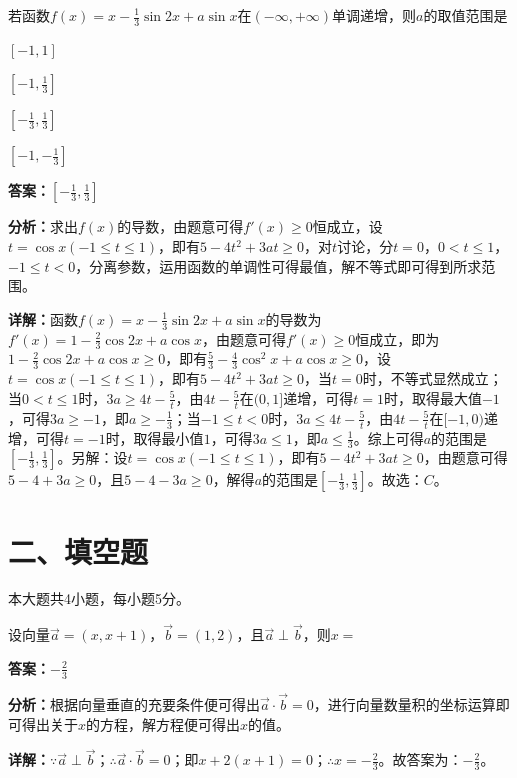 \begin{question}[points=5]
若函数$f(x)=x-\frac{1}{3}\sin2x+a\sin x$在$(-\infty,+\infty)$单调递增，则$a$的取值范围是
\begin{choices}
  \item $[-1,1]$
  \item $[-1,\frac{1}{3}]$
  \item $[-\frac{1}{3},\frac{1}{3}]$
  \item $[-1,-\frac{1}{3}]$
\end{choices}
\begin{solution}
\textbf{答案：}$[-\frac{1}{3},\frac{1}{3}]$

\textbf{分析：}求出$f(x)$的导数，由题意可得$f'(x)\ge0$恒成立，设$t=\cos x(-1\le t\le1)$，即有$5-4t^2+3at\ge0$，对$t$讨论，分$t=0$，$0<t\le1$，$-1\le t<0$，分离参数，运用函数的单调性可得最值，解不等式即可得到所求范围。

\textbf{详解：}函数$f(x)=x-\frac{1}{3}\sin2x+a\sin x$的导数为$f'(x)=1-\frac{2}{3}\cos2x+a\cos x$，由题意可得$f'(x)\ge0$恒成立，即为$1-\frac{2}{3}\cos2x+a\cos x\ge0$，即有$\frac{5}{3}-\frac{4}{3}\cos^2x+a\cos x\ge0$，设$t=\cos x(-1\le t\le1)$，即有$5-4t^2+3at\ge0$，当$t=0$时，不等式显然成立；当$0<t\le1$时，$3a\ge4t-\frac{5}{t}$，由$4t-\frac{5}{t}$在$(0,1]$递增，可得$t=1$时，取得最大值$-1$，可得$3a\ge-1$，即$a\ge-\frac{1}{3}$；当$-1\le t<0$时，$3a\le4t-\frac{5}{t}$，由$4t-\frac{5}{t}$在$[-1,0)$递增，可得$t=-1$时，取得最小值$1$，可得$3a\le1$，即$a\le\frac{1}{3}$。综上可得$a$的范围是$[-\frac{1}{3},\frac{1}{3}]$。另解：设$t=\cos x(-1\le t\le1)$，即有$5-4t^2+3at\ge0$，由题意可得$5-4+3a\ge0$，且$5-4-3a\ge0$，解得$a$的范围是$[-\frac{1}{3},\frac{1}{3}]$。故选：$C$。
\end{solution}
\end{question}

\section*{二、填空题}
本大题共4小题，每小题5分。

\begin{question}[points=5]
设向量$\vec{a}=(x,x+1)$，$\vec{b}=(1,2)$，且$\vec{a}\perp\vec{b}$，则$x=$
\fillin[{$-\frac{2}{3}$}]
\begin{solution}
\textbf{答案：}$-\frac{2}{3}$

\textbf{分析：}根据向量垂直的充要条件便可得出$\vec{a}\cdot\vec{b}=0$，进行向量数量积的坐标运算即可得出关于$x$的方程，解方程便可得出$x$的值。

\textbf{详解：}$\because \vec{a}\perp\vec{b}$；$\therefore \vec{a}\cdot\vec{b}=0$；即$x+2(x+1)=0$；$\therefore x=-\frac{2}{3}$。故答案为：$-\frac{2}{3}$。
\end{solution}
\end{question}

